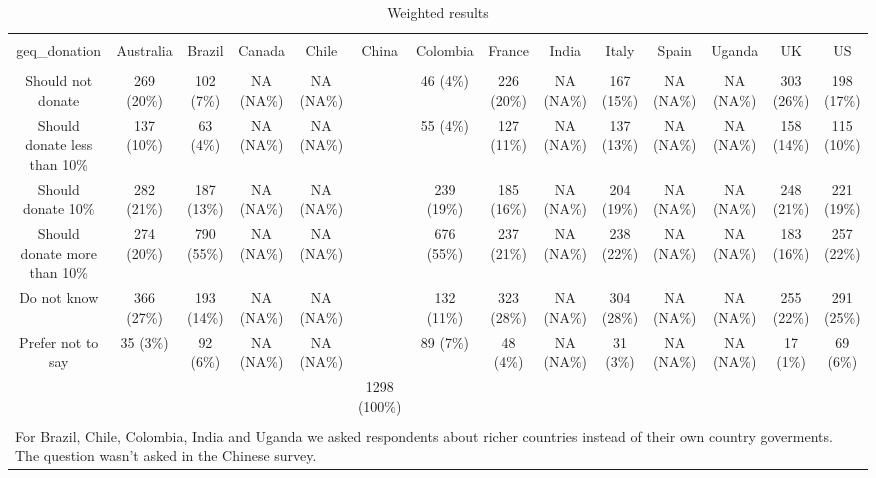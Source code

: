 
\begin{table}[!htbp] \centering 
  \caption{Weighted results} 
  \label{} 
\begin{tabular}{@{\extracolsep{5pt}} cccccccccccccc} 
\\[-1.8ex]\hline 
\hline \\[-1.8ex] 
geq\_donation & Australia & Brazil & Canada & Chile & China & Colombia & France & India & Italy & Spain & Uganda & UK & US \\ 
\hline \\[-1.8ex] 
Should not donate & 269 (20\%) & 102 (7\%) & NA (NA\%) & NA (NA\%) &  & 46 (4\%) & 226 (20\%) & NA (NA\%) & 167 (15\%) & NA (NA\%) & NA (NA\%) & 303 (26\%) & 198 (17\%) \\ 
Should donate less than 10\% & 137 (10\%) & 63 (4\%) & NA (NA\%) & NA (NA\%) &  & 55 (4\%) & 127 (11\%) & NA (NA\%) & 137 (13\%) & NA (NA\%) & NA (NA\%) & 158 (14\%) & 115 (10\%) \\ 
Should donate 10\% & 282 (21\%) & 187 (13\%) & NA (NA\%) & NA (NA\%) &  & 239 (19\%) & 185 (16\%) & NA (NA\%) & 204 (19\%) & NA (NA\%) & NA (NA\%) & 248 (21\%) & 221 (19\%) \\ 
Should donate more than 10\% & 274 (20\%) & 790 (55\%) & NA (NA\%) & NA (NA\%) &  & 676 (55\%) & 237 (21\%) & NA (NA\%) & 238 (22\%) & NA (NA\%) & NA (NA\%) & 183 (16\%) & 257 (22\%) \\ 
Do not know & 366 (27\%) & 193 (14\%) & NA (NA\%) & NA (NA\%) &  & 132 (11\%) & 323 (28\%) & NA (NA\%) & 304 (28\%) & NA (NA\%) & NA (NA\%) & 255 (22\%) & 291 (25\%) \\ 
Prefer not to say & 35 (3\%) & 92 (6\%) & NA (NA\%) & NA (NA\%) &  & 89 (7\%) & 48 (4\%) & NA (NA\%) & 31 (3\%) & NA (NA\%) & NA (NA\%) & 17 (1\%) & 69 (6\%) \\ 
 &  &  &  &  & 1298 (100\%) &  &  &  &  &  &  &  &  \\ 
\hline \\[-1.8ex] 
\multicolumn{14}{l}{For Brazil, Chile, Colombia, India and Uganda we asked respondents about richer countries instead of their own country goverments. The question wasn't asked in the Chinese survey.} \\ 
\end{tabular} 
\end{table} 
